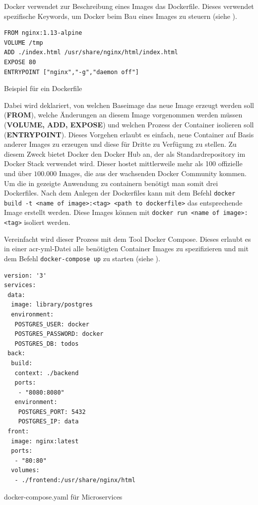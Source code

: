 Docker verwendet zur Beschreibung eines Images das Dockerfile. Dieses verwendet spezifische Keywords, um Docker beim Bau eines Images zu steuern (siehe ).

\begin{listing}[h]
	\begin{verbatim}
FROM nginx:1.13-alpine
VOLUME /tmp
ADD ./index.html /usr/share/nginx/html/index.html
EXPOSE 80
ENTRYPOINT ["nginx","-g","daemon off"]
	\end{verbatim}
	\caption{Beispiel für ein Dockerfile}
	\label{lst:dockerfileExmpl}
\end{listing}

Dabei wird deklariert, von welchen Baseimage das neue Image erzeugt werden soll (\textbf{FROM}), welche Änderungen an diesem Image vorgenommen werden müssen (\textbf{VOLUME, ADD, EXPOSE}) und welchen Prozess der Container isolieren soll (\textbf{ENTRYPOINT}). Dieses Vorgehen erlaubt es einfach, neue Container auf Basis anderer Images zu erzeugen und diese für Dritte zu Verfügung zu stellen. Zu diesem Zweck bietet Docker den Docker Hub an, der als Standardrepository im Docker Stack verwendet wird. Dieser hostet mittlerweile mehr als 100 offizielle und über $100.000$ Images, die aus der wachsenden Docker Community kommen. Um die in  gezeigte Anwendung zu containern benötigt man somit drei Dockerfiles. Nach dem Anlegen der Dockerfiles kann mit dem Befehl \texttt{docker build -t <name of image>:<tag> <path to dockerfile>} das entsprechende Image erstellt werden. Diese Images können mit \texttt{docker run <name of image>:<tag>} isoliert werden.

Vereinfacht wird dieser Prozess mit dem Tool Docker Compose. Dieses erlaubt es in einer \gls{acr-yml}-Datei alle benötigten Container Images zu spezifizieren und mit dem Befehl \texttt{docker-compose up} zu starten (siehe ).

\begin{listing}[h]
	\begin{verbatim}
version: '3'
services:
 data:
  image: library/postgres
  environment:
   POSTGRES_USER: docker
   POSTGRES_PASSWORD: docker
   POSTGRES_DB: todos
 back:
  build:
   context: ./backend
   ports:
    - "8080:8080"
   environment:
    POSTGRES_PORT: 5432
    POSTGRES_IP: data
 front:
  image: nginx:latest
  ports:
   - "80:80"
  volumes:
   - ./frontend:/usr/share/nginx/html
	\end{verbatim}
	\caption{docker-compose.yaml für Microservices}
	\label{lst:dockerComposeTodos}
\end{listing}


